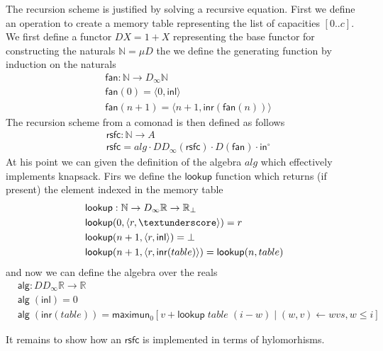 \documentclass[a4paper, UKenglish, cleveref, autoref, thm-restate]{lipics-v2021}
\newcommand{\N}{\mathbb{N}}
\newcommand{\Nat}{\N}
\newcommand{\R}{\mathbb{R}}
\newcommand{\comp}{\cdot}
\newcommand{\operator}[1]{\textsf{#1}}
\newcommand{\inl}{\operator{inl}}
\newcommand{\inr}{\operator{inr}}
\newcommand{\InOp}{\operator{in}^{\circ}}
\newcommand{\pair}[2]{\langle #1, #2 \rangle}
\begin{document}
The recursion scheme is justified by solving a recursive equation.  First we
define an operation to create a memory table representing the list of capacities
$[0..c]$. We first define a functor $D X = 1 + X$ representing the base functor
for constructing the naturals $\Nat = \mu D$ the we define the generating
function by induction on the naturals
\begin{align*}
  & \operator{fan} : \Nat \to D_{\infty}\Nat\\
  & \operator{fan} (0)    = \pair{0}{\inl}\\
  & \operator{fan} (n+1)  = \pair{n+1}{\inr (\operator{fan}(n))}
\end{align*}
The recursion scheme from a comonad is then defined as follows
\begin{align*}
  & \operator{rsfc} : \Nat \to A\\
  & \operator{rsfc} = alg \comp DD_{\infty}(\operator{rsfc}) \comp D(\operator{fan}) \comp \InOp
\end{align*}
At his point we can given the definition of the algebra $alg$ which effectively implements knapsack.
Firs we define the $\operator{lookup}$ function which returns (if present) the element indexed in the memory table
\begin{align*}
  & \operator{lookup} : \Nat \to D_{\infty} \R \to \R_{\bot}\\
  & \operator{lookup} (0,   \pair{r}{\textunderscore})  = r\\
  & \operator{lookup} (n+1, \pair{r}{\inl})         = \bot\\
  & \operator{lookup} (n+1, \pair{r}{\inr(table)})  = \operator{lookup} (n, table)
\end{align*}
and now we can define the algebra over the reals
\begin{align*}
  & \operator{alg} : DD_{\infty} \R \to \R\\
  & \operator{alg}\; (\inl)  = 0\\
  & \operator{alg}\; (\inr(table))  = \operator{maximun}_{0} [ v + \operator{lookup}\; table\; (i - w) \mid (w,v) \leftarrow wvs, w \le i]
\end{align*}

It remains to show how an $\operator{rsfc}$ is implemented in terms of
hylomorhisms.
\end{document}
